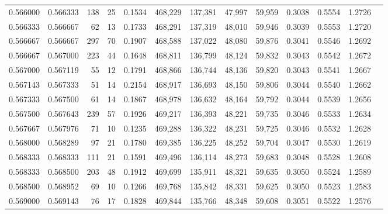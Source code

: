 \begin{tabular}{rrrrrrrrrrrrr}
0.566000 & 0.566333 &   138 &  25 &                                     0.1534 & 468,229 & 137,381 &  47,997 &  59,959 & 0.3038 & 0.5554 & 1.2726 \\
0.566333 & 0.566667 &    62 &  13 &                                     0.1733 & 468,291 & 137,319 &  48,010 &  59,946 & 0.3039 & 0.5553 & 1.2720 \\
0.566667 & 0.566667 &   297 &  70 &                                     0.1907 & 468,588 & 137,022 &  48,080 &  59,876 & 0.3041 & 0.5546 & 1.2692 \\
0.566667 & 0.567000 &   223 &  44 &                                     0.1648 & 468,811 & 136,799 &  48,124 &  59,832 & 0.3043 & 0.5542 & 1.2672 \\
0.567000 & 0.567119 &    55 &  12 &                                     0.1791 & 468,866 & 136,744 &  48,136 &  59,820 & 0.3043 & 0.5541 & 1.2667 \\
0.567143 & 0.567333 &    51 &  14 &                                     0.2154 & 468,917 & 136,693 &  48,150 &  59,806 & 0.3044 & 0.5540 & 1.2662 \\
0.567333 & 0.567500 &    61 &  14 &                                     0.1867 & 468,978 & 136,632 &  48,164 &  59,792 & 0.3044 & 0.5539 & 1.2656 \\
0.567500 & 0.567643 &   239 &  57 &                                     0.1926 & 469,217 & 136,393 &  48,221 &  59,735 & 0.3046 & 0.5533 & 1.2634 \\
0.567667 & 0.567976 &    71 &  10 &                                     0.1235 & 469,288 & 136,322 &  48,231 &  59,725 & 0.3046 & 0.5532 & 1.2628 \\
0.568000 & 0.568289 &    97 &  21 &                                     0.1780 & 469,385 & 136,225 &  48,252 &  59,704 & 0.3047 & 0.5530 & 1.2619 \\
0.568333 & 0.568333 &   111 &  21 &                                     0.1591 & 469,496 & 136,114 &  48,273 &  59,683 & 0.3048 & 0.5528 & 1.2608 \\
0.568333 & 0.568500 &   203 &  48 &                                     0.1912 & 469,699 & 135,911 &  48,321 &  59,635 & 0.3050 & 0.5524 & 1.2589 \\
0.568500 & 0.568952 &    69 &  10 &                                     0.1266 & 469,768 & 135,842 &  48,331 &  59,625 & 0.3050 & 0.5523 & 1.2583 \\
0.569000 & 0.569143 &    76 &  17 &                                     0.1828 & 469,844 & 135,766 &  48,348 &  59,608 & 0.3051 & 0.5522 & 1.2576 \\

\end{tabular}
